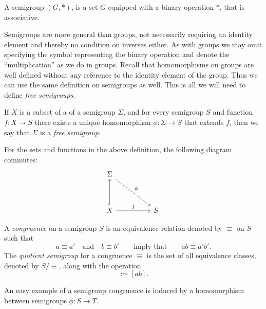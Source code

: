\begin{definition}
  A semigroup $(G,*)$, is a set $G$ equipped with a binary operation $*$, that is associative.
\end{definition}

Semigroups are more general than groups, not necessarily requiring an identity element and thereby no condition on inverses either. As with groups we may omit specifying the symbol representing the binary operation and denote the ``multiplication'' as we do in groups.
Recall that homomorphisms on groups are well defined without any reference to the identity element of the group. Thus we can use the same definition on semigroups as well. This is all we will need to define \emph{free semigroups}.

\begin{definition}
  If $X$ is a subset of a  of a semigroup $\Sigma$, and for every semigroup $S$ and function $f:X \rightarrow S$ there exists a unique homomorphism $\phi: \Sigma \rightarrow S$ that extends $f$, then we say that $\Sigma$ is a \emph{free semigroup}.
\end{definition}

For the sets and functions in the above definition, the following diagram commutes:
\begin{equation}
  \begin{tikzcd}[ampersand replacement=\&, sep=huge]
    \Sigma \arrow[dr,dashrightarrow,"\phi"] \\
    X \arrow[u,hook] \arrow[r,"f"] \& S.
  \end{tikzcd}
\end{equation}

\begin{definition}
  A \emph{congruence} on a semigroup $S$ is an equivalence relation denoted by $\equiv$ on $S$ such that
  \begin{equation*}
    a \equiv a' \quad\text{and}\quad b \equiv b' \qquad\text{imply that}\qquad ab \equiv a'b'.
  \end{equation*}
  The \emph{quotient semigroup} for a congruence $\equiv$ is the set of all equivalence classes, denoted by $S/\equiv$, along with the operation
  \begin{equation*}
    [a][b] := [ab].
  \end{equation*}
\end{definition}

An easy example of a semigroup congruence is induced by a homomorphism between semigroups $\phi:S \rightarrow T$.

